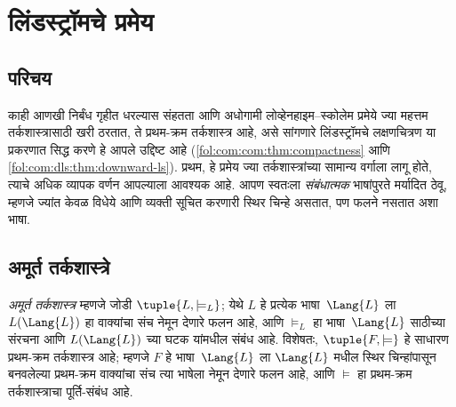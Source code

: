 \chapter{लिंडस्ट्रॉमचे प्रमेय}\label{mod:lin::chap}








\section{परिचय}\label{mod:lin:int:sec}

काही आणखी निर्बंध गृहीत धरल्यास संहतता आणि अधोगामी
लोव्हेनहाइम--स्कोलेम प्रमेये ज्या महत्तम तर्कशास्त्रासाठी खरी ठरतात, ते
प्रथम-क्रम तर्कशास्त्र आहे, असे सांगणारे लिंडस्ट्रॉमचे लक्षणचित्रण या
प्रकरणात सिद्ध करणे हे आपले उद्दिष्ट आहे
(\ref{fol:com:com:thm:compactness} आणि
\ref{fol:com:dls:thm:downward-ls}). प्रथम, हे प्रमेय ज्या
तर्कशास्त्रांच्या सामान्य वर्गाला लागू होते, त्याचे अधिक व्यापक वर्णन
आपल्याला आवश्यक आहे. आपण स्वतःला \emph{संबंधात्मक} भाषांपुरते मर्यादित
ठेवू, म्हणजे ज्यांत केवळ विधेये आणि व्यक्ती सूचित करणारी स्थिर
चिन्हे असतात, पण फलने नसतात अशा भाषा.











\section{अमूर्त तर्कशास्त्रे}\label{mod:lin:alg:sec}

\begin{defn}
\emph{अमूर्त तर्कशास्त्र} म्हणजे जोडी $
\tuple{L, \models_L}$; येथे $L$ हे प्रत्येक भाषा~$\Lang{L}$
ला $L(\Lang{L})$ हा वाक्यांचा संच नेमून देणारे फलन आहे, आणि
$\models_L$ हा भाषा~$\Lang{L}$ साठीच्या संरचना आणि
$L(\Lang{L})$ च्या घटक यांमधील संबंध आहे. विशेषतः,
$\tuple{F, \models}$ हे साधारण प्रथम-क्रम तर्कशास्त्र आहे; म्हणजे $F$ हे
भाषा~$\Lang{L}$ ला $\Lang{L}$ मधील स्थिर चिन्हांपासून बनवलेल्या प्रथम-क्रम
वाक्यांचा संच त्या भाषेला नेमून देणारे फलन आहे, आणि $\models$ हा
प्रथम-क्रम तर्कशास्त्राचा पूर्ति-संबंध आहे.
\end{defn}

